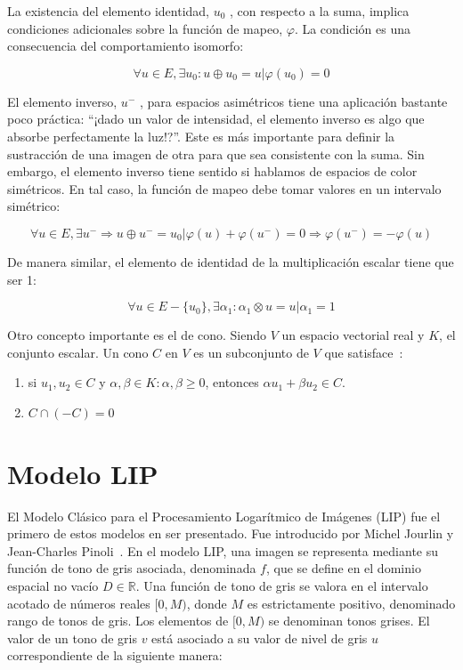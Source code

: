 La existencia del elemento identidad, $u_0$ , con respecto a la suma, implica condiciones adicionales sobre la función de mapeo, $\varphi$. La condición es una consecuencia del comportamiento isomorfo:

\begin{equation}
	\forall u\in E, \exists u_0 : u \oplus u_0 = u | \varphi(u_0)=0
\end{equation}

El elemento inverso, $u^-$ , para espacios asimétricos tiene una aplicación bastante poco práctica: ``\textquestiondown¡dado un valor de intensidad, el elemento inverso es algo que absorbe perfectamente la luz!?''. Este es más importante para definir la sustracción de una imagen de otra para que sea consistente con la suma. Sin embargo, el elemento inverso tiene sentido si hablamos de espacios de color simétricos. En tal caso, la función de mapeo debe tomar valores en un intervalo simétrico:

\begin{equation}
	\forall u \in E, \exists u^- \Rightarrow u \oplus u^- = u_0 | \varphi(u) + \varphi(u^-) = 0 \Rightarrow \varphi(u^-)=-\varphi(u) 
\end{equation}

De manera similar, el elemento de identidad de la multiplicación escalar tiene que ser 1:

\begin{equation}
	\forall u \in E - \{u_0\}, \exists \alpha_1 : \alpha_1 \otimes u = u | \alpha_1 = 1
\end{equation}

Otro concepto importante es el de cono. Siendo $V$ un espacio vectorial real y $K$, el conjunto escalar. Un cono $C$ en $V$ es un subconjunto de $V$ que satisface~\cite{barker1981theory}:

\begin{enumerate}
	\item si $u_1,u_2\in C$ y $\alpha,\beta\in K:\alpha,\beta\geq0$, entonces $\alpha u_1+\beta u_2\in C$.
	\item $C \cap (-C)={0}$
\end{enumerate}

\section{Modelo LIP}

El Modelo Cl\'asico para el Procesamiento Logar\'itmico de Im\'agenes (LIP) fue el primero de estos modelos en ser presentado. Fue introducido por Michel Jourlin y Jean-Charles Pinoli~\cite{jourlin1988model}. En el modelo LIP, una imagen se representa mediante su función de tono de gris asociada, denominada $f$, que se define en el dominio espacial no vacío $D \in \mathbb{R}$. Una función de tono de gris se valora en el intervalo acotado de números reales $[0, M)$, donde $M$ es estrictamente positivo, denominado rango de tonos de gris. Los elementos de $[0, M )$ se denominan tonos grises. El valor de un tono de gris $v$ est\'a asociado a su valor de nivel de gris $u$ correspondiente de la siguiente manera:


